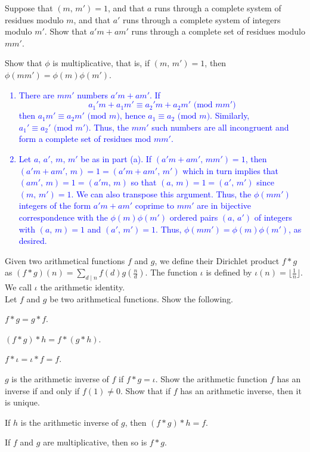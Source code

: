 \documentclass[a4paper,11pt]{article}
\theoremstyle{mythm}
\theoremstyle{mydef}
\newcommand{\blue}[1]{\textcolor{blue}{#1}}
\renewcommand{\pmod}[1]{\text{ (mod $#1$)}}
\begin{document}
\begin{enumerate*}[{\bf (a)}]
\item Suppose that $(m,\,m')=1$, and that $a$ runs through a complete system of
  residues modulo $m$, and that $a'$ runs through a complete system of integers
  modulo $m'$. Show that $a'm+am'$ runs through a complete set of residues
  modulo $mm'$.
\item Show that $\phi$ is multiplicative, that is, if $(m,\,m')=1$, then
  $\phi(mm')=\phi(m)\phi(m')$.
\end{enumerate*}

\blue{
  \begin{enumerate}[{\bf (a)}]
  \item There are $mm'$ numbers $a'm+am'$. If
    \[
      a_1'm+a_1m' \equiv a_2'm+a_2m' \pmod{mm'}
    \]
    then $a_1m' \equiv a_2m' \pmod{m}$, hence $a_1 \equiv a_2 \pmod{m}$.
    Similarly, $a_1' \equiv a_2' \pmod{m'}$. Thus, the $mm'$ such numbers are
    all incongruent and form a complete set of residues mod $mm'$.
  \item Let $a,\,a',\,m,\,m'$ be as in part (a). If $(a'm+am',\,mm')=1$, then
    $(a'm+am',\,m)=1=(a'm+am',\,m')$ which in turn implies that
    $(am',\,m)=1=(a'm,\,m)$ so that $(a,\,m)=1=(a',\,m')$ since $(m,\,m')=1$. We
    can also transpose this argument. Thus, the $\phi(mm')$ integers of the form
    $a'm+am'$ coprime to $mm'$ are in bijective correspondence with the
    $\phi(m)\phi(m')$ ordered pairs $(a,\,a')$ of integers with $(a,\,m)=1$ and
    $(a',\,m')=1$. Thus, $\phi(mm')=\phi(m)\phi(m')$, as desired.
  \end{enumerate}
}

Given two arithmetical functions $f$ and $g$, we define their Dirichlet product
$f*g$ as $(f*g)(n)=\sum_{d \mid n}f(d)g(\frac{n}{d})$. The function $\iota$ is
defined by $\iota(n)=\lfloor \frac{1}{n} \rfloor$. We call $\iota$ the
arithmetic identity. \\

 Let $f$ and $g$ be two arithmetical functions. Show
the following.
\begin{enumerate*}[{\bf (a)}]
\item $f*g = g*f$.
\item $(f*g)*h=f*(g*h)$.
\item $f*\iota = \iota*f=f$.
\item $g$ is the arithmetic inverse of $f$ if $f*g=\iota$. Show the arithmetic
  function $f$ has an inverse if and only if $f(1) \neq 0$. Show that if $f$ has
  an arithmetic inverse, then it is unique.
\item If $h$ is the arithmetic inverse of $g$, then $(f*g)*h=f$.
\item If $f$ and $g$ are multiplicative, then so is $f*g$.
\end{enumerate*}
\end{document}

